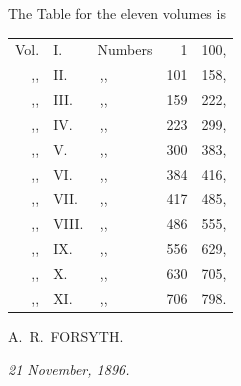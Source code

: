 \documentclass[12pt,a4paper,oneside]{book}
\begin{document}
\clearpage

\fancyhead[L]{\textsc{\thepage}}\fancyhead[R]{}

\vspace*{2em}

\noindent The Table for the eleven volumes is

\vspace{1em}

\begin{center}
\begin{tabular}{rl@{\quad}l@{\quad}r@{ to }r}
Vol. & I.    & Numbers & 1   & 100,\\
\,,, & II.   & \,,,    & 101 & 158,\\
\,,, & III.  & \,,,    & 159 & 222,\\
\,,, & IV.   & \,,,    & 223 & 299,\\
\,,, & V.    & \,,,    & 300 & 383,\\
\,,, & VI.   & \,,,    & 384 & 416,\\
\,,, & VII.  & \,,,    & 417 & 485,\\
\,,, & VIII. & \,,,    & 486 & 555,\\
\,,, & IX.   & \,,,    & 556 & 629,\\
\,,, & X.    & \,,,    & 630 & 705,\\
\,,, & XI.   & \,,,    & 706 & 798.
\end{tabular}
\end{center}

\vspace{2em}

\begin{flushright}
A.~R.~FORSYTH.
\end{flushright}

\vspace{1em}

\begin{flushleft}
\textit{21 November, 1896.}
\end{flushleft}

\clearpage

\fancyhf{}\fancyhead[R]{\textsc{\thepage}}\fancyhead[L]{}

\thispagestyle{plain}%
\end{document}
